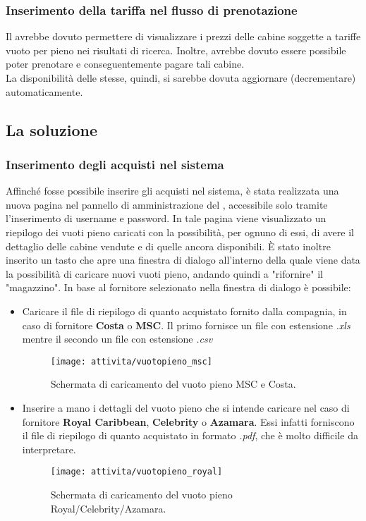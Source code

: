 \subsubsection{Inserimento della tariffa nel flusso di prenotazione}
Il \bookingEngine avrebbe dovuto permettere di visualizzare i prezzi delle cabine soggette a tariffe vuoto per pieno nei risultati di ricerca. Inoltre, avrebbe dovuto essere possibile poter prenotare e conseguentemente pagare tali cabine.\\La disponibilità delle stesse, quindi, si sarebbe dovuta aggiornare (decrementare) automaticamente.

\subsection{La soluzione}
\subsubsection{Inserimento degli acquisti nel sistema}
Affinché fosse possibile inserire gli acquisti nel sistema, è stata realizzata una nuova pagina nel pannello di amministrazione del \bookingEngine, accessibile solo tramite l'inserimento di username e password. In tale pagina viene visualizzato un riepilogo dei vuoti pieno caricati con la possibilità, per ognuno di essi, di avere il dettaglio delle cabine vendute e di quelle ancora disponibili. È stato inoltre inserito un tasto che apre una finestra di dialogo all'interno della quale viene data la possibilità di caricare nuovi vuoti pieno, andando quindi a "rifornire" il "magazzino". In base al fornitore selezionato nella finestra di dialogo è possibile: 
\begin{itemize}
	\item Caricare il file di riepilogo di quanto acquistato fornito dalla compagnia, in caso di fornitore \textbf{Costa} o \textbf{MSC}. Il primo fornisce un file con estensione \textit{.xls} mentre il secondo un file con estensione \textit{.csv}
	\begin{figure}[!h] 
		\centering 
		\texttt{[image: attivita/vuotopieno\_msc]} 
		\caption{Schermata di caricamento del vuoto pieno MSC e Costa.}
	\end{figure}
	\item Inserire a mano i dettagli del vuoto pieno che si intende caricare nel caso di fornitore \textbf{Royal Caribbean}, \textbf{Celebrity} o \textbf{Azamara}. Essi infatti forniscono il file di riepilogo di quanto acquistato in formato \textit{.pdf}, che è molto difficile da interpretare.
	\begin{figure}[!h] 
		\centering 
		\texttt{[image: attivita/vuotopieno\_royal]} 
		\caption{Schermata di caricamento del vuoto pieno Royal/Celebrity/Azamara.}
	\end{figure}
\end{itemize}
